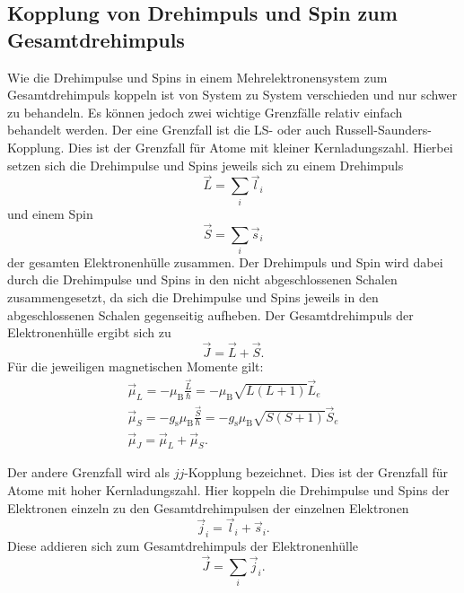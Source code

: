 \subsection{Kopplung von Drehimpuls und Spin zum Gesamtdrehimpuls}

Wie die Drehimpulse und Spins in einem Mehrelektronensystem zum Gesamtdrehimpuls koppeln ist von System zu System verschieden und nur schwer zu behandeln. Es können jedoch zwei wichtige Grenzfälle relativ einfach behandelt werden. Der eine Grenzfall ist die LS- oder auch Russell-Saunders-Kopplung. Dies ist der Grenzfall für Atome mit kleiner Kernladungszahl. Hierbei setzen sich die Drehimpulse und Spins jeweils sich zu einem Drehimpuls
\begin{equation}
	\vec{L}=\sum_i \vec{l}_i
\end{equation}
und einem Spin 
\begin{equation}
	\vec{S}=\sum_i \vec{s}_i
\end{equation}
der gesamten Elektronenhülle zusammen. Der Drehimpuls und Spin wird dabei durch die Drehimpulse und Spins in den nicht abgeschlossenen Schalen zusammengesetzt, da sich die Drehimpulse und Spins jeweils in den abgeschlossenen Schalen gegenseitig aufheben. Der Gesamtdrehimpuls der Elektronenhülle ergibt sich zu 
\begin{equation}
	\vec{J}=\vec{L}+\vec{S}.
\end{equation}
Für die jeweiligen magnetischen Momente gilt:
\begin{gather}
	\vec{\mu}_L=-  \mu_\text{B} \frac{\vec{L}}{\hbar}=- \mu_\text{B} \sqrt{L(L+1)} \vec{L}_e\\
	\vec{\mu}_S=- g_\text{s} \mu_\text{B} \frac{\vec{S}}{\hbar}=- g_\text{s} \mu_\text{B} \sqrt{S(S+1)} \vec{S}_e\\
	\vec{\mu}_J=\vec{\mu}_L+\vec{\mu}_S.
\end{gather}

Der andere Grenzfall wird als $jj$-Kopplung bezeichnet. Dies ist der Grenzfall für Atome mit hoher Kernladungszahl. Hier koppeln die Drehimpulse und Spins der Elektronen einzeln zu den Gesamtdrehimpulsen der einzelnen Elektronen 
\begin{equation}
	\vec{j}_i=\vec{l}_i+\vec{s}_i.
\end{equation}
Diese addieren sich zum Gesamtdrehimpuls der Elektronenhülle
\begin{equation}
	\vec{J}=\sum_i \vec{j}_i .
\end{equation}



